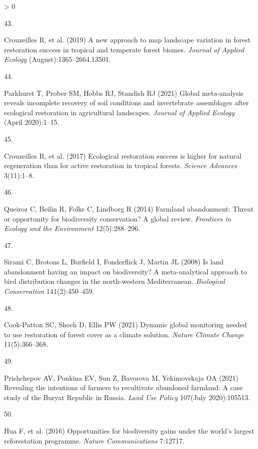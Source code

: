 \documentclass[9pt,twocolumn,twoside,]{pnas-new}
\newlength{\csllabelwidth}
\newlength{\cslhangindent}
\newenvironment{CSLReferences}[2] %
 {%
  \setlength{\parindent}{0pt}
  \ifodd #1 \everypar{\setlength{\hangindent}{\cslhangindent}}\ignorespaces\fi
  \ifnum #2 > 0
  \setlength{\parskip}{#2\baselineskip}
  \fi
 }%
 {}
\newcommand{\CSLLeftMargin}[1]{\parbox[t]{\csllabelwidth}{#1}}
\newcommand{\CSLRightInline}[1]{\parbox[t]{\linewidth - \csllabelwidth}{#1}\break}
\begin{document}
\begin{CSLReferences}{0}{0}
\leavevmode\hypertarget{ref-Crouzeilles2019}{}%
\CSLLeftMargin{43. }
\CSLRightInline{Crouzeilles R, et al. (2019) {A new approach to map
landscape variation in forest restoration success in tropical and
temperate forest biomes}. \emph{Journal of Applied Ecology}
(August):1365--2664.13501.}

\leavevmode\hypertarget{ref-Parkhurst2021}{}%
\CSLLeftMargin{44. }
\CSLRightInline{Parkhurst T, Prober SM, Hobbs RJ, Standish RJ (2021)
{Global meta-analysis reveals incomplete recovery of soil conditions and
invertebrate assemblages after ecological restoration in agricultural
landscapes}. \emph{Journal of Applied Ecology} (April 2020):1--15.}

\leavevmode\hypertarget{ref-Crouzeilles2017}{}%
\CSLLeftMargin{45. }
\CSLRightInline{Crouzeilles R, et al. (2017) {Ecological restoration
success is higher for natural regeneration than for active restoration
in tropical forests}. \emph{Science Advances} 3(11):1--8.}

\leavevmode\hypertarget{ref-Queiroz2014}{}%
\CSLLeftMargin{46. }
\CSLRightInline{Queiroz C, Beilin R, Folke C, Lindborg R (2014)
{Farmland abandonment: Threat or opportunity for biodiversity
conservation? A global review}. \emph{Frontiers in Ecology and the
Environment} 12(5):288--296.}

\leavevmode\hypertarget{ref-Sirami2008}{}%
\CSLLeftMargin{47. }
\CSLRightInline{Sirami C, Brotons L, Burfield I, Fonderflick J, Martin
JL (2008) {Is land abandonment having an impact on biodiversity? A
meta-analytical approach to bird distribution changes in the
north-western Mediterranean}. \emph{Biological Conservation}
141(2):450--459.}

\leavevmode\hypertarget{ref-Cook-Patton2021}{}%
\CSLLeftMargin{48. }
\CSLRightInline{Cook-Patton SC, Shoch D, Ellis PW (2021) {Dynamic global
monitoring needed to use restoration of forest cover as a climate
solution}. \emph{Nature Climate Change} 11(5):366--368.}

\leavevmode\hypertarget{ref-Prishchepov2021a}{}%
\CSLLeftMargin{49. }
\CSLRightInline{Prishchepov AV, Ponkina EV, Sun Z, Bavorova M,
Yekimovskaja OA (2021) {Revealing the intentions of farmers to
recultivate abandoned farmland: A case study of the Buryat Republic in
Russia}. \emph{Land Use Policy} 107(July 2020):105513.}

\leavevmode\hypertarget{ref-Hua2016}{}%
\CSLLeftMargin{50. }
\CSLRightInline{Hua F, et al. (2016) {Opportunities for biodiversity
gains under the world's largest reforestation programme}. \emph{Nature
Communications} 7:12717.}


\end{CSLReferences}
\end{document}
